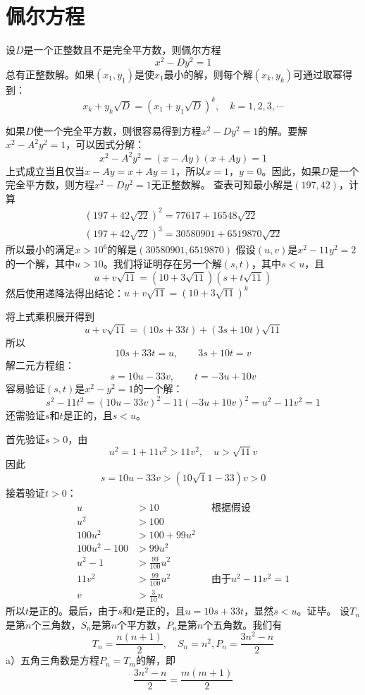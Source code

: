 \chapter{佩尔方程}
\begin{theorem}[佩尔方程定理]
设$D$是一个正整数且不是完全平方数，则佩尔方程
\[x^2-Dy^2=1\]
总有正整数解。如果$(x_1,y_1)$是使$x_1$最小的解，则每个解$(x_k,y_k)$可通过取幂得到：
\[x_k+y_k\sqrt D=(x_1+y_1\sqrt D)^k,\quad k=1,2,3,\cdots\]
\end{theorem}
%
\exercise 如果$D$使一个完全平方数，则很容易得到方程$x^2-Dy^2=1$的解。要解$x^2-A^2y^2=1$，可以因式分解：
\[x^2-A^2y^2=(x-Ay)(x+Ay)=1\]
上式成立当且仅当$x-Ay=x+Ay=1$，所以$x=1$，$y=0$。因此，如果$D$是一个完全平方数，则方程$x^2-Dy^2=1$无正整数解。
%
\exercise 查表可知最小解是$(197,42)$，计算
\begin{gather*}
\left(197+42\sqrt{22}\right)^2=77617+16548\sqrt{22} \\
\left(197+42\sqrt{22}\right)^3=30580901+6519870\sqrt{22}
\end{gather*}
所以最小的满足$x>10^6$的解是$(30580901,6519870)$
%
\exercise 假设$(u,v)$是$x^2-11y^2=2$的一个解，其中$u>10$。我们将证明存在另一个解$(s,t)$，其中$s<u$，且
\[u+v\sqrt{11}=(10+3\sqrt{11})(s+t\sqrt{11})\]
然后使用递降法得出结论：$u+v\sqrt{11}=(10+3\sqrt{11})^k$\par
将上式乘积展开得到
\[u+v\sqrt{11}=(10s+33t)+(3s+10t)\sqrt{11}\]
所以
\[10s+33t=u,\qquad 3s+10t=v\]
解二元方程组：
\[s=10u-33v,\qquad t=-3u+10v\]
容易验证$(s,t)$是$x^2-y^2=1$的一个解：
\[s^2-11t^2=(10u-33v)^2-11(-3u+10v)^2=u^2-11v^2=1\]
还需验证$s$和$t$是正的，且$s<u$。\par
首先验证$s>0$，由
\[u^2=1+11v^2>11v^2,\quad u>\sqrt{11}v\]
因此
\[s=10u-33v>(10\sqrt11-33)v>0\]
接着验证$t>0$：
\begin{align*}
u&>10 && \text{根据假设} \\
u^2&>100 && \\
100u^2&>100+99u^2 && \\
100u^2-100&>99u^2 && \\
u^2-1&>\frac{99}{100}u^2 && \\
11v^2&>\frac{99}{100}u^2 && \text{由于}u^2-11v^2=1 \\
v&>\frac{3}{10}u &&
\end{align*}
所以$t$是正的。最后，由于$s$和$t$是正的，且$u=10s+33t$，显然$s<u$。证毕。
%
\exercise 设$T_n$是第$n$个三角数，$S_n$是第$n$个平方数，$P_n$是第$n$个五角数。我们有
\[T_n=\frac{n(n+1)}{2},\quad S_n=n^2, P_n=\frac{3n^2-n}{2}\]
a）五角三角数是方程$P_n=T_m$的解，即
\[\frac{3n^2-n}{2}=\frac{m(m+1)}{2}\]
